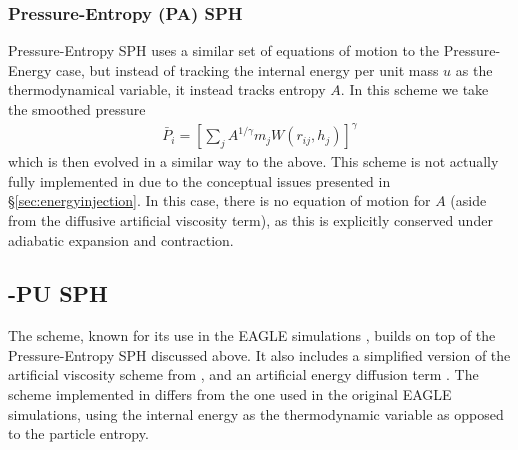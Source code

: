\subsubsection{Pressure-Entropy (PA) SPH}

Pressure-Entropy SPH uses a similar set of equations of motion to the
Pressure-Energy case, but instead of tracking the internal energy per unit
mass $u$ as the thermodynamical variable, it instead tracks entropy $A$.
In this scheme we take the smoothed pressure
\begin{align}
    \bar{P}_i = \left[ 
        \sum_j A^{1 / \gamma} m_j W(r_{ij}, h_j)
    \right]^\gamma
\end{align}
which is then evolved in a similar way to the above. This scheme is not
actually fully implemented in \swift{} due to the conceptual issues presented
in \S \ref{sec:energyinjection}. In this case, there is no equation of motion
for $A$ (aside from the diffusive artificial viscosity term), as this is
explicitly conserved under adiabatic expansion and contraction.

\subsection{\anarchy{}-PU SPH}

The \anarchy{} scheme, known for its use in the EAGLE simulations
\citep{Schaye2015, Crain2015, Schaller2015}, builds on top of the
Pressure-Entropy SPH discussed above. It also includes a simplified version
of the artificial viscosity scheme from \citet{Cullen2010}, and an artificial
energy diffusion term \citep{Price2008}. The scheme implemented in \swift{}
differs from the one used in the original EAGLE simulations, using the
internal energy as the thermodynamic variable as opposed to the particle
entropy.

